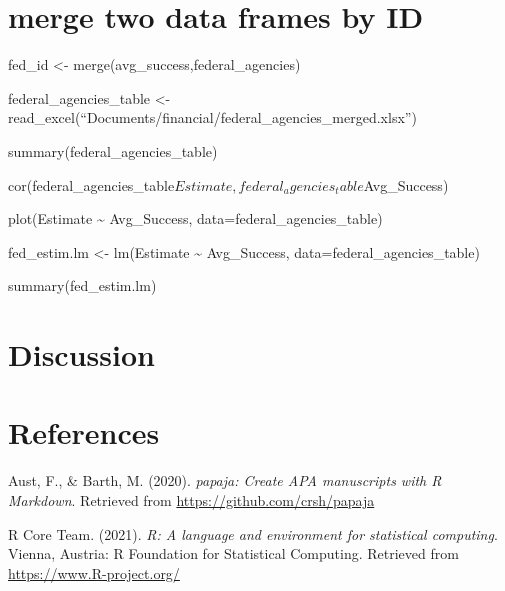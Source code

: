 \documentclass[
  english,
  man]{apa6}
\newlength{\cslhangindent}
\newlength{\cslentryspacingunit} %
\newenvironment{CSLReferences}[2] %
 {%
  \setlength{\parindent}{0pt}
  \ifodd #1
  \let\oldpar\par
  \def\par{\hangindent=\cslhangindent\oldpar}
  \fi
  \setlength{\parskip}{#2\cslentryspacingunit}
 }%
 {}
\begin{document}
\hypertarget{merge-two-data-frames-by-id}{%
\section{merge two data frames by ID}\label{merge-two-data-frames-by-id}}

fed\_id \textless- merge(avg\_success,federal\_agencies)

federal\_agencies\_table \textless- read\_excel(``Documents/financial/federal\_agencies\_merged.xlsx'')

summary(federal\_agencies\_table)

cor(federal\_agencies\_table\(Estimate, federal_agencies_table\)Avg\_Success)

plot(Estimate \textasciitilde{} Avg\_Success, data=federal\_agencies\_table)

fed\_estim.lm \textless- lm(Estimate \textasciitilde{} Avg\_Success, data=federal\_agencies\_table)

summary(fed\_estim.lm)

\hypertarget{discussion}{%
\section{Discussion}\label{discussion}}

\newpage

\hypertarget{references}{%
\section{References}\label{references}}

\begingroup
\setlength{\parindent}{-0.5in}
\setlength{\leftskip}{0.5in}

\hypertarget{refs}{}
\begin{CSLReferences}{1}{0}
\leavevmode{}%
Aust, F., \& Barth, M. (2020). \emph{{papaja}: {Create} {APA} manuscripts with {R Markdown}}. Retrieved from \url{https://github.com/crsh/papaja}

\leavevmode{}%
R Core Team. (2021). \emph{R: A language and environment for statistical computing}. Vienna, Austria: R Foundation for Statistical Computing. Retrieved from \url{https://www.R-project.org/}

\end{CSLReferences}

\endgroup
\end{document}

